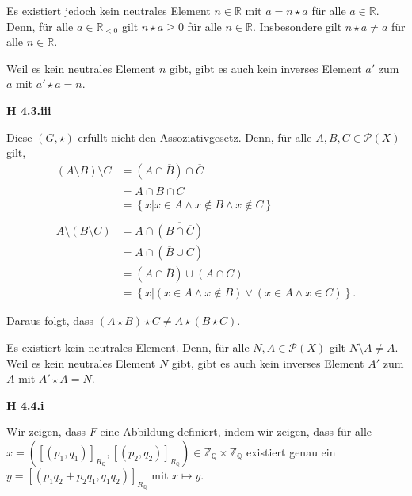 \documentclass[12pt]{extarticle}
\begin{document}
\vspace{4mm}

Es existiert jedoch kein neutrales Element \(n \in \mathbb{R}\) mit
\(a=n \star a\) für alle \(a \in \mathbb{R}\).  Denn, für alle
\(a \in \mathbb{R}_{<0}\) gilt \(n \star a \geq 0\) für alle
\(n \in \mathbb{R}\).  Insbesondere gilt \(n \star a \neq a\) für alle
\(n \in \mathbb{R}\).

\vspace{4mm}

Weil es kein neutrales Element \(n\) gibt, gibt es auch kein inverses
Element \(a'\) zum \(a\) mit \(a' \star a = n\).

\vspace{4mm}
\textbf{H 4.3.iii}

Diese \((G, \star)\) erfüllt nicht den Assoziativgesetz.  Denn, für alle
\(A, B, C \in \mathcal{P}(X)\) gilt,
\begin{align*}
  (A \setminus B) \setminus C
  &= (A \cap \overline{B}) \cap \overline{C}\\
  &= A \cap \overline{B} \cap \overline{C}\\
  &= \left\{ x|x \in A \wedge x \notin B \wedge x \notin C \right\}\\
  \\
  A \setminus (B \setminus C)
  &= A \cap \overline{(B \cap \overline{C})}\\
  &= A \cap (\overline{B} \cup C)\\
  &= (A \cap \overline{B}) \cup (A \cap C)\\
  &= \left\{ x | (x \in A \wedge x \notin B) \lor (x \in A \wedge x
    \in C) \right\}.
\end{align*}

Daraus folgt, dass \((A \star B) \star C \neq A \star (B \star C)\).

\vspace{4mm}

Es existiert kein neutrales Element.  Denn, für alle $N, A \in
\mathcal{P}(X)$ gilt \(N \setminus A \neq A\).
Weil es kein neutrales Element \(N\) gibt, gibt es auch kein inverses
Element \(A'\) zum \(A\) mit \(A' \star A = N\).

\vspace{4mm}

\textbf{H 4.4.i}

Wir zeigen, dass \(F\) eine Abbildung definiert, indem wir zeigen, dass
für alle $x=([(p_1,q_1)]_{R_{\mathbb{Q}}},[(p_2,q_2)]_{R_{\mathbb{Q}}})
\in \mathbb{Z}_{\mathbb{Q}} \times \mathbb{Z}_{\mathbb{Q}}$
existiert genau ein \(y=[(p_1q_2+p_2q_1,q_1q_2)]_{R_{\mathbb{Q}}}\) mit
\(x \mapsto y\).
\end{document}
